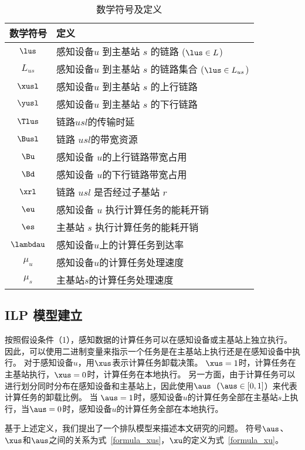 \begin{table}[!h]
  \caption{数学符号及定义}
  \vspace{-1em}
  \label{table_notations_ispa}
  \centering
  \begin{tabular}{c|p{8cm}}
  \hline
  \textbf{数学符号} & \textbf{定义}\\
  \hline
  $\lus$ & 感知设备$u$ 到主基站 $s$ 的链路 ($\lus \in L$)\\\hline
  $L_{us}$ & 感知设备$u$ 到主基站 $s$ 的链路集合 ($\lus \in L_{us}$)\\\hline
  $\xusl$ & 感知设备$u$ 到主基站 $s$ 的上行链路\\\hline
  $\yusl$ & 感知设备$u$ 到主基站 $s$ 的下行链路\\\hline
  $\Tlus$ & 链路$usl$的传输时延\\\hline
  $\Busl$ & 链路 $usl$的带宽资源\\\hline
  $\Bu$ & 感知设备 $u$的上行链路带宽占用\\\hline
  $\Bd$ & 感知设备 $u$的下行链路带宽占用\\\hline
  $\xrl$ & 链路 $usl$ 是否经过子基站 $r$\\\hline
  $\eu$ & 感知设备 $u$ 执行计算任务的能耗开销\\\hline
  $\es$ & 主基站 $s$ 执行计算任务的能耗开销\\\hline
  $\lambdau$ & 感知设备$u$上的计算任务到达率\\\hline
  $\mu_u$ & 感知设备$u$的计算任务处理速度\\\hline
  $\mu_s$ & 主基站$s$的计算任务处理速度\\\hline
  \end{tabular}
\end{table}

\subsection{ILP 模型建立}

按照假设条件（1），感知数据的计算任务可以在感知设备或主基站上独立执行。
因此，可以使用二进制变量来指示一个任务是在主基站上执行还是在感知设备中执行。
对于感知设备$u$，用$\xus$表示计算任务卸载决策。
$\xus = 1$时，计算任务在主基站执行，$\xus = 0$时，计算任务在本地执行。
另一方面，由于计算任务可以进行划分同时分布在感知设备和主基站上，因此使用$\aus$（$\aus \in [0,1]$）来代表计算任务的卸载比例。
当 $\aus = 1$时，感知设备$u$的计算任务全部在主基站$s$上执行，当$\aus = 0$时，感知设备$u$的计算任务全部在本地执行。

基于上述定义，我们提出了一个排队模型来描述本文研究的问题。 符号$\aus$、$\xus$和$\aus$之间的关系为式~\eqref{formula_xus}，$\xu$的定义为式~\eqref{formula_xu}。

